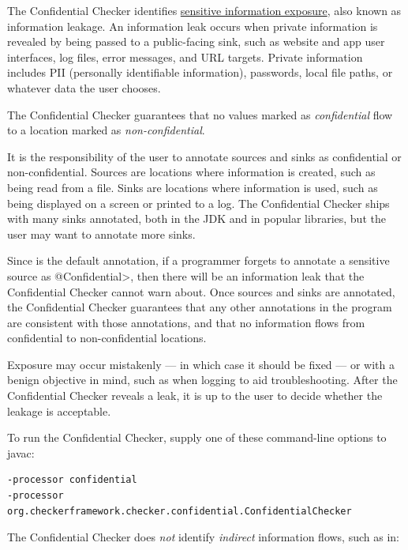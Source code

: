 
The Confidential Checker identifies
\href{https://cwe.mitre.org/data/definitions/1417.html}{sensitive information
exposure}, also known as information leakage. An information leak occurs
when private information is revealed by being passed to a public-facing
sink, such as website and app user interfaces, log files, error messages,
and URL targets.  Private information includes PII (personally identifiable
information), passwords, local file paths, or whatever data the user
chooses.

The Confidential Checker guarantees that no values marked as
\emph{confidential} flow to a location marked as \emph{non-confidential}.

It is the responsibility of the user to annotate sources and sinks as
confidential or non-confidential.  Sources are locations where information
is created, such as being read from a file.  Sinks are locations where
information is used, such as being displayed on a screen or printed to a
log.  The Confidential Checker ships with many sinks annotated, both in the
JDK and in popular libraries, but the user may want to annotate more sinks.

Since  is the default annotation, if a programmer
forgets to annotate a sensitive source as \<@Confidential>, then there will
be an information leak that the Confidential Checker cannot warn about.
Once sources and sinks are annotated, the Confidential Checker guarantees
that any other annotations in the program are consistent with those
annotations, and that no information flows from confidential to
non-confidential locations.

Exposure may occur mistakenly --- in which case
it should be fixed --- or with a benign objective in mind, such as when
logging to aid troubleshooting.  After the Confidential Checker reveals a
leak, it is up to the user to decide whether the leakage is acceptable.

To run the Confidential Checker, supply one of these
command-line options to javac:
\begin{Verbatim}
-processor confidential
-processor org.checkerframework.checker.confidential.ConfidentialChecker
\end{Verbatim}



The Confidential Checker does \emph{not} identify \emph{indirect}
information flows, such as in:

